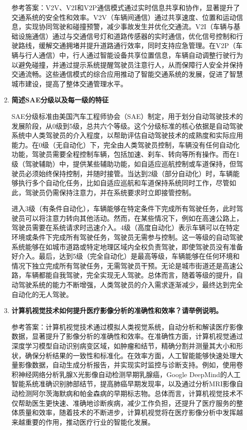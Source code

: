\begin{enumerate}
参考答案：V2V、V2I和V2P通信模式通过实时信息共享和协作，显著提升了交通系统的安全性和效率。V2V（车辆间通信）通过共享速度、位置和运动信息，实现协同驾驶和碰撞预警，减少事故发生并优化交通流。V2I（车辆与基础设施通信）通过与交通信号灯和道路传感器的实时通信，优化信号控制和行驶路线，缓解交通拥堵并提升道路通行效率，同时支持应急管理。在V2P（车辆与行人通信）中，行人通过智能设备共享位置信息，车辆自动调整行驶行为以避免碰撞，并通过提示系统提醒驾驶员注意行人，从而保障行人安全并保持交通流畅。这些通信模式的综合应用推动了智能交通系统的发展，促进了智慧城市建设，提高了整体交通管理水平。

\item \textbf{简述SAE分级以及每一级的特征}

SAE分级标准由美国汽车工程师协会（SAE）制定，用于划分自动驾驶技术的发展阶段，从0级到5级，总共六个等级。这个分级标准的核心依据是自动驾驶系统中人类驾驶员的介入程度，以帮助评估自动驾驶技术的成熟度和实际应用能力。在0级（无自动化）下，完全由人类驾驶员控制，车辆没有任何自动化功能，驾驶员需要全程控制车辆，包括加速、刹车、转向等所有操作。而在1级（驾驶辅助）中，提供某些辅助功能，如自适应巡航控制或车道保持，但驾驶员必须始终保持控制，并随时接管。当达到2级（部分自动化）时，车辆能够执行多个自动化任务，比如自适应巡航和车道保持系统同时工作，尽管如此，驾驶员仍需保持注意力，并在系统要求时立即接管控制。

进入3级（有条件自动化），车辆能够在特定条件下完成所有驾驶任务，此时驾驶员可以将注意力转向其他活动。然而，在某些情况下，例如在高速公路上，驾驶员需要在系统请求时迅速介入。4级（高度自动化）表示车辆可以在特定环境或条件下完成所有驾驶任务，驾驶员无需参与控制。这一等级的自动驾驶系统能够在如城市道路或特定地理区域内全权负责驾驶，即使驾驶员没有准备好介入。最后，达到5级（完全自动化）是最高等级，车辆能够在任何环境和情况下独立完成所有驾驶任务，无需驾驶员干预。无论是城市街道还是高速公路，车辆都能自我驾驶，完全实现无人驾驶。总体而言，随着等级的提升，自动驾驶系统的能力不断增强，人类驾驶员的介入需求逐渐减少，最终达到完全自动化的无人驾驶。

\item \textbf{计算机视觉技术如何提升医疗影像分析的准确性和效率？请举例说明。}

参考答案：计算机视觉技术通过模拟人类视觉系统，自动分析和解读医疗影像数据，显著提升了影像分析的准确性和效率。在准确性方面，计算机视觉通过深度学习模型自动识别病变区域，如肿瘤和结节，精确分割并测量其大小和形状，确保分析结果的一致性和标准化。在效率方面，人工智能能够快速处理大量影像数据，自动生成分析报告，并实现实时监控与诊断支持。例如，使用卷积神经网络分析乳腺X光影像自动检测早期乳腺癌，Google DeepMind的人工智能系统准确识别肺部结节，提高肺癌早期发现率，以及通过分析MRI影像自动检测阿尔茨海默病和帕金森病的早期标志物。总体而言，计算机视觉技术不仅帮助医生更快速、准确地诊断疾病，减少工作负担，还提升了医疗服务的整体质量和效率，随着技术的不断进步，计算机视觉将在医疗影像分析中发挥越来越重要的作用，推动医疗行业的智能化发展。


\end{enumerate}
